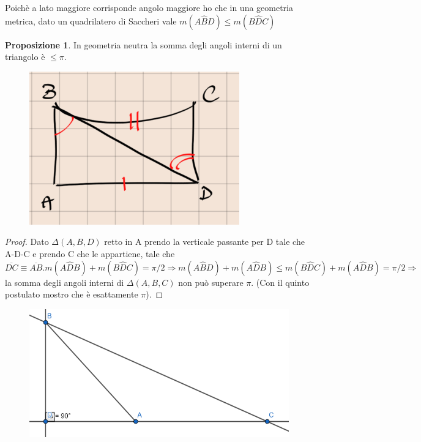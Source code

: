 \documentclass[a4paper,10pt]{article}
\theoremstyle{definition}
\theoremstyle{indentdefinition}
\theoremstyle{indentpostulate}
\theoremstyle{indenttheorem}
\newtheorem{prop}{Proposizione}[section]
\theoremstyle{myremark}
\theoremstyle{indentgeneral}
\newenvironment{myboxed} 
{\noindent\begin{lrbox}{\mybox}\begin{minipage}{\textwidth}}
{\end{minipage}\end{lrbox}\fbox{\usebox{\mybox}}}
\begin{document}
Poichè a lato maggiore corrisponde angolo maggiore ho che in una geometria metrica, dato un quadrilatero di Saccheri vale $m(A\hat{B}D) \leq m(B \hat{D}C)$

\begin{myboxed}
\begin{prop} In geometria neutra la somma degli angoli interni di un triangolo è $\le \pi$. \\ \end{prop} 
\end{myboxed}
\begin{figure}[H]
    \centering
    \includegraphics[scale=0.3]{Saccheri4.png}
\end{figure}
\begin{proof}   Dato $\Delta (A,B,D)$ retto in A prendo la verticale passante per D tale che A-D-C e prendo C che le appartiene, tale che $\overline{DC} \equiv \overline{AB}. m(A\hat{D}B)+m(B\hat{D}C)= \pi /2 \Rightarrow m(A \hat{B}D)+m(A \hat{D}B) \leq m(B \hat{D}C)+m(A \hat{D}B)= \pi /2 \Rightarrow$ la somma degli angoli interni di $\Delta (A,B,C)$ non può superare $\pi $. (Con il quinto postulato mostro che è esattamente $\pi $).   \end{proof} 

\begin{figure}[H]
    \centering
    \includegraphics[scale=0.25]{Triangoli4.png}
\end{figure}
\end{document}

